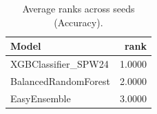 \begin{table}[t]
\centering
\begin{tabular}{lr}
\toprule
Model & rank \\
\midrule
XGBClassifier_SPW24 & 1.0000 \\
BalancedRandomForest & 2.0000 \\
EasyEnsemble & 3.0000 \\
\bottomrule
\end{tabular}
\caption{Average ranks across seeds (Accuracy).}
\label{tab:avg_rank_Accuracy}
\end{table}